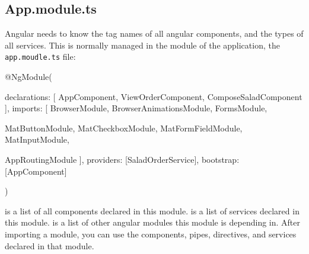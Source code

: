 \begin{itemize}

\section{App.module.ts}
Angular needs to know the tag names of all angular components, and the types of all services. This is normally managed in the module of the application, the \texttt{app.moudle.ts} file:
\begin{Code}
@NgModule({
  declarations: [
    AppComponent,
    ViewOrderComponent,
    ComposeSaladComponent
  ],
  imports: [
    BrowserModule,
    BrowserAnimationsModule,
    FormsModule,

    MatButtonModule,
    MatCheckboxModule,
    MatFormFieldModule,
    MatInputModule,

    AppRoutingModule
  ],
  providers: [SaladOrderService],
  bootstrap: [AppComponent]
})
\end{Code}
 is a list of all components declared in this module.  is a list of services declared in this module.  is a list of other angular modules this module is depending in. After importing a module, you can use the components, pipes,  directives, and services declared in that module.
\end{itemize}

